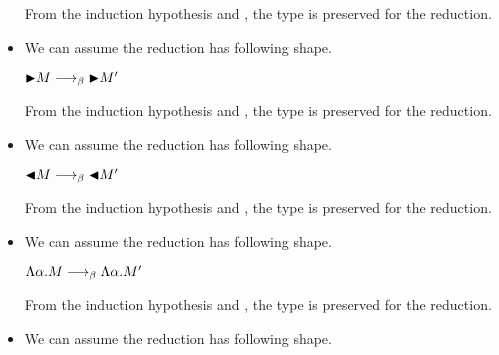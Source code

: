 \begin{itemize}
	      From the induction hypothesis and \TConv, the type is preserved for the reduction.
	      	      	      	      	      	      		      	      	      	      	      
	\item \TTB
	      	      	      	      	      	      		      	      	      	      	      
	      We can assume the reduction has following shape.
	      	      	      	      	      	      		      	      	      	      	      
	      ${\mathop{\blacktriangleright}} M \longrightarrow_{\beta} {\mathop{\blacktriangleright}} M'$
	      	      	      	      	      	      		      	      	      	      	      
	      From the induction hypothesis and \TTB, the type is preserved for the reduction.
	      	      	      	      	      	      		      	      	      	      	      
	\item \TTBL
	      	      	      	      	      	      		      	      	      	      	      
	      We can assume the reduction has following shape.
	      	      	      	      	      	      		      	      	      	      	      
	      ${\mathop{\blacktriangleleft}} M \longrightarrow_{\beta} {\mathop{\blacktriangleleft}} M'$
	      	      	      	      	      	      		      	      	      	      	      
	      From the induction hypothesis and \TTBL, the type is preserved for the reduction.
	      	      	      	      	      	      		      	      	      	      	      
	\item \TGen
	      	      	      	      	      	      		      	      	      	      	      
	      We can assume the reduction has following shape.
	      	      	      	      	      	      		      	      	      	      	      
	      $\Lambda\alpha. M \longrightarrow_{\beta} \Lambda\alpha. M'$
	      	      	      	      	      	      		      	      	      	      	      
	      From the induction hypothesis and \TGen, the type is preserved for the reduction.
	      	      	      	      	      	      		      	      	      	      	      
	\item \TIns
	      	      	      	      	      	      		      	      	      	      	      
	      We can assume the reduction has following shape.
	      	      	      	      	      	      		      	      	      	      	      

\end{itemize}
